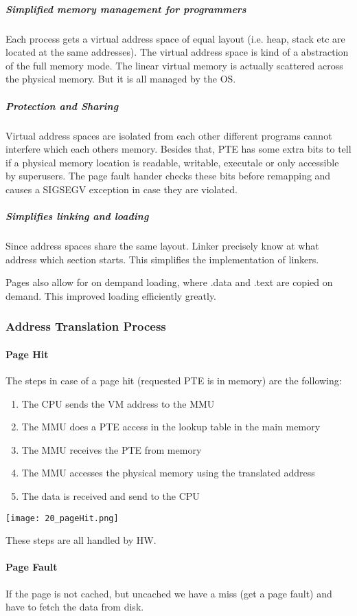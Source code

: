\subparagraph{Simplified memory management for programmers}
Each process gets a virtual address space of equal layout (i.e. heap, stack etc are located at the same addresses). The virtual address space is kind of a abstraction of the full memory mode. The linear virtual memory is actually scattered across the physical memory. But it is all managed by the OS.

\subparagraph{Protection and Sharing}
Virtual address spaces are isolated from each other different programs cannot interfere which each others memory. Besides that, PTE has some extra bits to tell if a physical memory location is readable, writable, executale or only accessible by superusers. The page fault hander checks these bits before remapping and causes a SIGSEGV exception in case they are violated.

\subparagraph{Simplifies linking and loading}
Since address spaces share the same layout. Linker precisely know at what address which section starts. This simplifies the implementation of linkers.

Pages also allow for on dempand loading, where .data and .text are copied on demand. This improved loading efficiently greatly.


\subsubsection{Address Translation Process}

\paragraph{Page Hit}
The steps in case of a page hit (requested PTE is in memory) are the following:
\begin{enumerate}
    \item The CPU sends the VM address to the MMU
    \item The MMU does a PTE access in the lookup table in the main memory
    \item The MMU receives the PTE from memory
    \item The MMU accesses the physical memory using the translated address
    \item The data is received and send to the CPU
\end{enumerate}

\texttt{[image: 20\_pageHit.png]}

These steps are all handled by HW.

\paragraph{Page Fault}
If the page is not cached, but uncached we have a miss (get a page fault) and have to fetch the data from disk.


